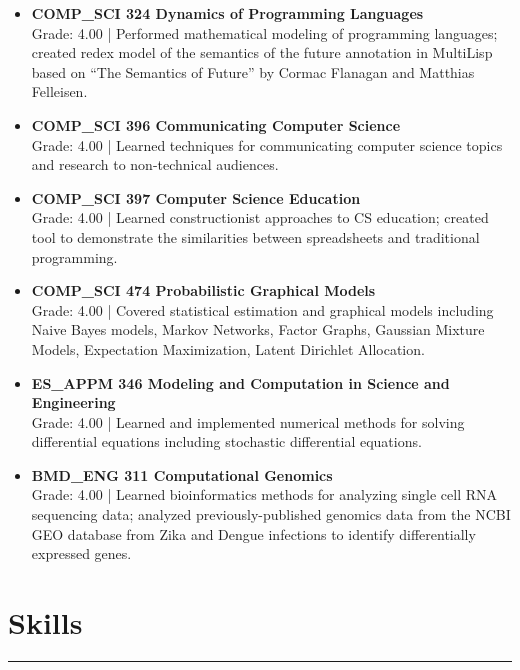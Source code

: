 \documentclass{article}
\begin{document}
\begin{itemize}[leftmargin=1.5in]
    \item[Spring 2024] \textbf{COMP\_SCI 324 Dynamics of Programming Languages}\\
    Grade: 4.00 | Performed mathematical modeling of programming languages; created redex model of the semantics of the future annotation in MultiLisp based on ``The Semantics of Future'' by Cormac Flanagan and Matthias Felleisen.
    \item[Spring 2024] \textbf{COMP\_SCI 396 Communicating Computer Science}\\
    Grade: 4.00 | Learned techniques for communicating computer science topics and research to non-technical audiences.
    \item[Winter 2024] \textbf{COMP\_SCI 397 Computer Science Education}\\
    Grade: 4.00 | Learned constructionist approaches to CS education; created tool to demonstrate the similarities between spreadsheets and traditional programming.
    \item[Fall 2023] \textbf{COMP\_SCI 474 Probabilistic Graphical Models}\\
    Grade: 4.00 | Covered statistical estimation and graphical models including Naive Bayes models, Markov Networks, Factor Graphs, Gaussian Mixture Models, Expectation Maximization, Latent Dirichlet Allocation.
    \item[Winter 2023] \textbf{ES\_APPM 346 Modeling and Computation in Science and Engineering}\\
    Grade: 4.00 | Learned and implemented numerical methods for solving differential equations including stochastic differential equations.
    \item[Fall 2022] \textbf{BMD\_ENG 311 Computational Genomics}\\
    Grade: 4.00 | Learned bioinformatics methods for analyzing single cell RNA sequencing data; analyzed previously-published genomics data from the NCBI GEO database from Zika and Dengue infections to identify differentially expressed genes.
\end{itemize}

\section*{Skills}
\hrule
\vspace{10pt}
\end{document}
